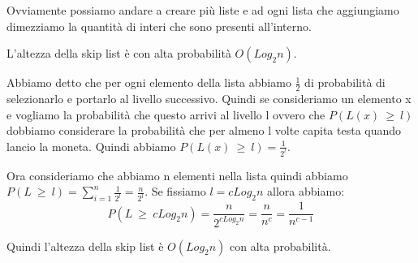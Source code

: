 \documentclass[14pt]{extreport}
\begin{document}
Ovviamente possiamo andare a creare più liste e ad ogni lista che aggiungiamo dimezziamo la quantità di interi che sono presenti all'interno.

 L'altezza della skip list è con alta probabilità $O(Log_2n)$.

 Abbiamo detto che per ogni elemento della lista abbiamo $\frac{1}{2}$ di probabilità di selezionarlo e portarlo al livello successivo. Quindi se consideriamo un elemento x e vogliamo la probabilità che questo arrivi al livello l ovvero che $P(L(x)\ \geq \ l)$ dobbiamo considerare la probabilità che per almeno l volte capita testa quando lancio la moneta. Quindi abbiamo $P(L(x)\ \geq \ l) = \frac{1}{2^l}$.

Ora consideriamo che abbiamo n elementi nella lista quindi abbiamo $P(L\ \geq \ l) = \sum^n_{i=1} \frac{1}{2^l} = \frac{n}{2^l}$.
Se fissiamo $l=cLog_2n$ allora abbiamo:
\begin{equation}
P(L\ \geq \ cLog_2n) = \frac{n}{2^{cLog_2n}} = \frac{n}{n^c} = \frac{1}{n^{c-1}}
\end{equation}

Quindi l'altezza della skip list è $O(Log_2 n)$ con alta probabilità.
\end{document}
